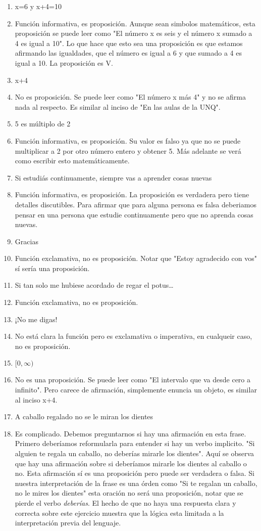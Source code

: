 \documentclass[a4paper]{article}
\newcommand{\Item}{\item[\stepcounter{enumii}$\blacktriangleright$\textbf{(\alph{enumii})}]} %
\newcommand{\answer}{\item[**]}
\begin{document}
\begin{enumerate}
\begin{multicols}{2}
\begin{enumerate} [label=(\alph*)]
		\Item x=6 y x+4=10 
		\answer Función informativa, es proposición. Aunque sean simbolos matemáticos, esta proposición se puede leer como "El número x es seis y el número x sumado a 4 es igual a 10". Lo que hace que esto sea una proposición es que estamos afirmando las igualdades, que el número es igual a 6 y que sumado a 4 es igual a 10. La proposición es V.

		\Item x+4 
		\answer No es proposición. Se puede leer como "El número x más 4" y no se afirma nada al respecto. Es similar al inciso de "En las aulas de la UNQ".

		\item 5 es múltiplo de 2 
		\answer Función informativa, es proposición. Su valor es falso ya que no se puede multiplicar a 2 por otro número entero y obtener 5. Más adelante se verá como escribir esto matemáticamente.

		\item Si estudiás continuamente, siempre vas a aprender cosas nuevas 
		\answer Función informativa, es proposición. La proposición es verdadera pero tiene detalles discutibles. Para afirmar que para alguna persona es falsa deberiamos pensar en una persona que estudie continuamente pero que no aprenda cosas nuevas.

		\item Gracias
		\answer Función exclamativa, no es proposición. Notar que "Estoy agradecido con vos" sí sería una proposición.

		\Item Si tan solo me hubiese acordado de regar el potus…
		\answer Función exclamativa, no es proposición.

		\item ¡No me digas!
		\answer No está clara la función pero es exclamativa o imperativa, en cualqueir caso, no es proposición.

		\item $ [ 0, \infty )$
		\answer No es una proposición. Se puede leer como "El intervalo que va desde cero a infinito". Pero carece de afirmación, simplemente enuncia un objeto, es similar al inciso x+4.

		\Item A caballo regalado no se le miran los dientes 
		\answer Es complicado. Debemos preguntarnos si hay una afirmación en esta frase. Primero deberíamos reformularla para entender si hay un verbo implicito. "Si alguien te regala un caballo, no deberías mirarle los dientes". Aquí se observa que hay una afirmación sobre si deberíamos mirarle los dientes al caballo o no. Esta afirmación sí es una proposición pero puede ser verdadera o falsa. Si nuestra interpretación de la frase es una órden como "Si te regalan un caballo, no le mires los dientes" esta oración no será una proposición, notar que se pierde el verbo \textit{deberías}. El hecho de que no haya una respuesta clara y correcta sobre este ejercicio muestra que la lógica esta limitada a la interpretación previa del lenguaje. 


\end{enumerate}
\end{multicols}
\end{enumerate}
\end{document}
